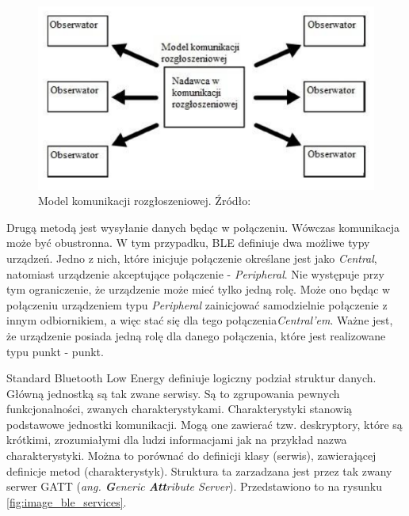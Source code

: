 \begin{figure}[H]
	\centering
	\includegraphics[width=12cm]{img/theory/BLE/ble_advertising.png}
	\caption{Model komunikacji rozgłoszeniowej. Źródło: \cite{inzynierka}}
	\label{fig:image_ble_advertising}
\end{figure}

Drugą metodą jest wysyłanie danych będąc w połączeniu. Wówczas komunikacja może być obustronna. W tym przypadku, BLE definiuje dwa możliwe typy urządzeń. Jedno z nich, które inicjuje połączenie określane jest jako \textit{Central}, natomiast urządzenie akceptujące połączenie - \textit{Peripheral}. Nie występuje przy tym ograniczenie, że urządzenie może mieć tylko jedną rolę. Może ono będąc w połączeniu urządzeniem typu \textit{Peripheral} zainicjować samodzielnie połączenie z innym odbiornikiem, a więc stać się dla tego połączenia\textit{Central'em}. Ważne jest, że urządzenie posiada jedną rolę dla danego połączenia, które jest realizowane typu punkt - punkt. 

Standard Bluetooth Low Energy definiuje logiczny podział struktur danych. Główną jednostką są tak zwane serwisy. Są to zgrupowania pewnych funkcjonalności, zwanych charakterystykami. Charakterystyki stanowią podstawowe jednostki komunikacji. Mogą one zawierać tzw. deskryptory, które są krótkimi, zrozumiałymi dla ludzi informacjami jak na przykład nazwa charakterystyki. Można to porównać do definicji klasy (serwis), zawierającej definicje metod (charakterystyk). Struktura ta zarzadzana jest przez tak zwany serwer GATT (\textit{ang. \textbf{G}eneric \textbf{Att}ribute Server}). Przedstawiono to na rysunku \ref{fig:image_ble_services}. 

